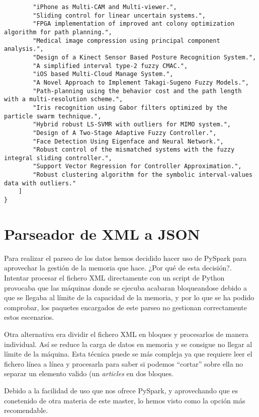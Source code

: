 \begin{verbatim}
        "iPhone as Multi-CAM and Multi-viewer.", 
        "Sliding control for linear uncertain systems.", 
        "FPGA implementation of improved ant colony optimization algorithm for path planning.", 
        "Medical image compression using principal component analysis.", 
        "Design of a Kinect Sensor Based Posture Recognition System.", 
        "A simplified interval type-2 fuzzy CMAC.", 
        "iOS based Multi-Cloud Manage System.", 
        "A Novel Approach to Implement Takagi-Sugeno Fuzzy Models.", 
        "Path-planning using the behavior cost and the path length with a multi-resolution scheme.", 
        "Iris recognition using Gabor filters optimized by the particle swarm technique.", 
        "Hybrid robust LS-SVMR with outliers for MIMO system.", 
        "Design of A Two-Stage Adaptive Fuzzy Controller.", 
        "Face Detection Using Eigenface and Neural Network.", 
        "Robust control of the mismatched systems with the fuzzy integral sliding controller.", 
        "Support Vector Regression for Controller Approximation.", 
        "Robust clustering algorithm for the symbolic interval-values data with outliers."
    ]
}
\end{verbatim}

\section{Parseador de XML a JSON}\label{sec:parser}

Para realizar el parseo de los datos hemos decidido hacer uso de PySpark para aprovechar la gestión de la memoria que hace. ¿Por qué de esta decisión?. Intentar procesar el fichero \gls{XML} directamente con un script de Python provocaba que las máquinas donde se ejecuba acabaran bloqueandose debido a que se llegaba al límite de la capacidad de la memoria, y por lo que se ha podido comprobar, los paquetes encargados de este parseo no gestionan correctamente estos escenarios.

Otra alternativa era dividir el fichero XML en bloques y procesarlos de manera individual. Así se reduce la carga de datos en memoria y se consigue no llegar al límite de la máquina. Esta técnica puede se más compleja ya que requiere leer el fichero línea a línea y procesarla para saber si podemos ``cortar'' sobre ella no separar un elemento valido (un \textit{articles} en dos bloques.

Debido a la facilidad de uso que nos ofrece PySpark, y aprovechando que es conetenido de otra materia de este master, lo hemos visto como la opción más recomendable.

